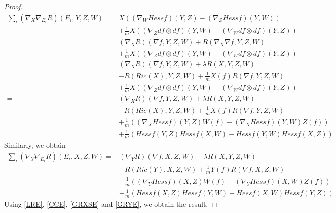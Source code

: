 \documentclass[10pt,a4paper]{amsart}
\begin{document}
\begin{proof}
{\begin{align}
    \sum_{i}(\nabla_{X}\nabla_{E_{i}}R)(E_{i},Y,Z,W) =&X((\nabla_{W}Hessf)(Y,Z)-(\nabla_{Z}Hessf)(Y,W))\nonumber\\& + \frac{1}{m}X((\nabla_{Z}df \otimes df)(Y,W) - (\nabla_{W}df \otimes df)(Y,Z))\nonumber\\=&(\nabla_{X}R)(\nabla f,Y,Z,W) + R(\nabla_{X}\nabla f,Y,Z,W)\nonumber\\& + \frac{1}{m}X((\nabla_{Z}df \otimes df)(Y,W) - (\nabla_{W}df \otimes df)(Y,Z))\nonumber\\=&(\nabla_{X}R)(\nabla f,Y,Z,W) + \lambda R(X,Y,Z,W)\nonumber\\&-R(Ric(X),Y,Z,W) + \frac{1}{m}X(f)R(\nabla f,Y,Z,W)\nonumber\\& + \frac{1}{m}X((\nabla_{Z}df \otimes df)(Y,W) - (\nabla_{W}df \otimes df)(Y,Z))\nonumber\\=&(\nabla_{X}R)(\nabla f,Y,Z,W) + \lambda R(X,Y,Z,W)\nonumber\\&-R(Ric(X),Y,Z,W) + \frac{1}{m}X(f)R(\nabla f,Y,Z,W)\nonumber\\&+ \frac{1}{m}((\nabla_{X}Hessf)(Y,Z)W(f) - (\nabla_{X}Hessf)(Y,W)Z(f))\nonumber\\&+\frac{1}{m}(Hessf(Y,Z)Hessf(X,W) - Hessf(Y,W)Hessf(X,Z))
\end{align}}
Similarly, we obtain
{\small
\begin{align}\label{GRYE}
    \sum_{i}(\nabla_{Y}\nabla_{E_{i}}R)(E_{i},X,Z,W)=&(\nabla_{Y}R)(\nabla f,X,Z,W) - \lambda R(X,Y,Z,W)\nonumber\\&-R(Ric(Y),X,Z,W) + \frac{1}{m}Y(f)R(\nabla f,X,Z,W)\nonumber\\&+ \frac{1}{m}((\nabla_{Y}Hessf)(X,Z)W(f) - (\nabla_{Y}Hessf)(X,W)Z(f))\nonumber\\&+\frac{1}{m}(Hessf(X,Z)Hessf(Y,W) - Hessf(X,W)Hessf(Y,Z))
\end{align}}
Using \cref{LRE}, \cref{CCE}, \cref{GRXSE} and \cref{GRYE}, we obtain the result.
\end{proof}
\end{document}

